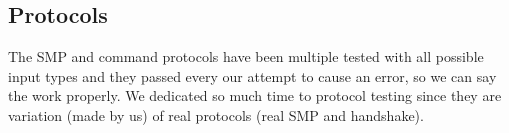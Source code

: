 \subsection{Protocols}
\small{The SMP and command protocols have been multiple tested with all possible input types and they passed every our attempt to cause an error, so we can say the work properly. We dedicated so much time to protocol testing since they are variation (made by us) of real protocols (real SMP and handshake).}